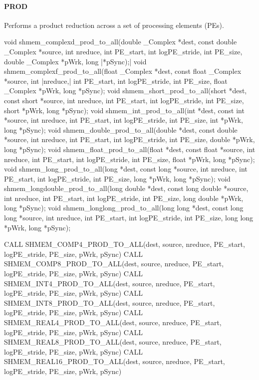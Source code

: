 \begin{apidefinition}
\paragraph{PROD}
Performs a product reduction across a set of processing elements (\acp{PE}).\newline
\begin{Csynopsis}
void shmem_complexd_prod_to_all(double _Complex *dest, const double _Complex *source, int nreduce, int PE_start, int logPE_stride, int PE_size, double _Complex *pWrk, long |\mbox{*pSync);}|
void shmem_complexf_prod_to_all(float _Complex *dest, const float _Complex *source, int |\mbox{nreduce,}| int PE_start, int logPE_stride, int PE_size, float _Complex *pWrk, long *pSync);
void shmem_short_prod_to_all(short *dest, const short *source, int nreduce, int PE_start, int logPE_stride, int PE_size, short *pWrk, long *pSync);
void shmem_int_prod_to_all(int *dest, const int *source, int nreduce, int PE_start, int logPE_stride, int PE_size, int *pWrk, long *pSync);
void shmem_double_prod_to_all(double *dest, const double *source, int nreduce, int PE_start, int logPE_stride, int PE_size, double *pWrk, long *pSync);
void shmem_float_prod_to_all(float *dest, const float *source, int nreduce, int PE_start, int logPE_stride, int PE_size, float *pWrk, long *pSync);
void shmem_long_prod_to_all(long *dest, const long *source, int nreduce, int PE_start, int logPE_stride, int PE_size, long *pWrk, long *pSync);
void shmem_longdouble_prod_to_all(long double *dest, const long double *source, int nreduce, int PE_start, int logPE_stride, int PE_size, long double *pWrk, long *pSync);
void shmem_longlong_prod_to_all(long long *dest, const long long *source, int nreduce, int PE_start, int logPE_stride, int PE_size, long long *pWrk, long *pSync);
\end{Csynopsis}

\begin{Fsynopsis}
CALL SHMEM_COMP4_PROD_TO_ALL(dest, source, nreduce, PE_start, logPE_stride, PE_size, pWrk, pSync)
CALL SHMEM_COMP8_PROD_TO_ALL(dest, source, nreduce, PE_start, logPE_stride, PE_size, pWrk, pSync)
CALL SHMEM_INT4_PROD_TO_ALL(dest, source, nreduce, PE_start, logPE_stride, PE_size, pWrk, pSync)
CALL SHMEM_INT8_PROD_TO_ALL(dest, source, nreduce, PE_start, logPE_stride, PE_size, pWrk, pSync)
CALL SHMEM_REAL4_PROD_TO_ALL(dest, source, nreduce, PE_start, logPE_stride, PE_size, pWrk, pSync)
CALL SHMEM_REAL8_PROD_TO_ALL(dest, source, nreduce, PE_start, logPE_stride, PE_size, pWrk, pSync)
CALL SHMEM_REAL16_PROD_TO_ALL(dest, source, nreduce, PE_start, logPE_stride, PE_size, pWrk, pSync)
\end{Fsynopsis}


\end{apidefinition}
